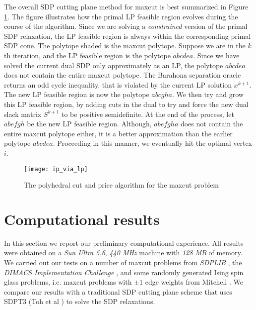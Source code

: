\documentclass[12pt]{article}
\begin{document}
The overall SDP cutting plane method for maxcut is best summarized
in Figure \ref{ip_via_lp_fig}. The figure illustrates how the
primal LP feasible region evolves during the course of the
algorithm. Since we are solving a {\em constrained} version of the
primal SDP relaxation, the LP feasible region is always within the
corresponding primal SDP cone. The polytope shaded is the maxcut
polytope. Suppose we are in the $k$th iteration, and the LP
feasible region is the polytope $abcdea$. Since we have solved the
current dual SDP only approximately as an LP, the polytope
$abcdea$ does not contain the entire maxcut polytope. The Barahona
separation oracle returns an odd cycle inequality, that is
violated by the current LP solution $x^{k+1}$. The new LP feasible
region is now the polytope $abcgha$. We then try and grow this LP
feasible region, by adding cuts in the dual to try and force the
new dual slack matrix $S^{k+1}$ to be positive semidefinite. At
the end of the process, let $abefgh$ be the new LP feasible
region. Although, $abefgha$ does not contain the entire maxcut
polytope either, it is a better approximation than the earlier
polytope $abcdea$. Proceeding in this manner, we eventually hit
the optimal vertex $i$.
\begin{figure}[htbp]
\centering
\texttt{[image: ip\_via\_lp]}
\caption{\label{ip_via_lp_fig} The polyhedral cut and price
algorithm for the maxcut problem}
\end{figure}

\section{Computational results}
\label{maxcut_computational_results} In this section we report our
preliminary computational experience. All results were obtained on
a {\em Sun Ultra 5.6}, {\em 440 MHz} machine with {\em 128 MB} of
memory. We carried out our tests on a number of maxcut problems
from {\em SDPLIB} \cite{SDPLIB}, the {\em DIMACS Implementation
Challenge} \cite{pataki4}, and some randomly generated Ising spin
glass problems, i.e. maxcut problems with $\pm 1$ edge weights
from Mitchell \cite{JEMising}. We compare our results with a
traditional SDP cutting plane scheme that uses SDPT3 (Toh et al
\cite{toh1}) to solve the SDP relaxations.
\end{document}
